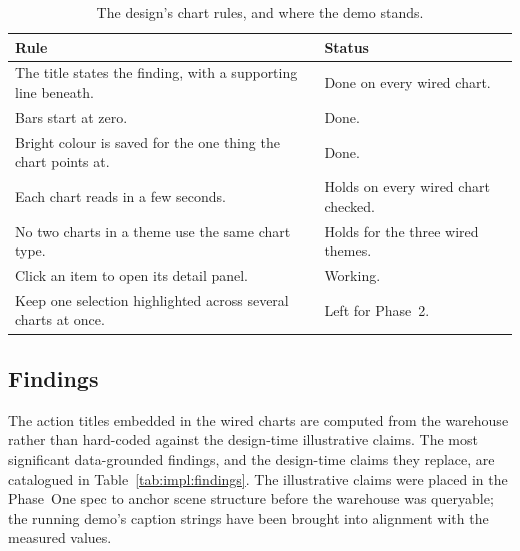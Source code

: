 \begin{table}[!htbp]
\centering
\caption{The design's chart rules, and where the demo stands.}
\label{tab:impl:invariants}
\footnotesize
\renewcommand{\arraystretch}{1.3}
\begin{tabularx}{\linewidth}{Xp{4cm}}
\hline
\textbf{Rule} & \textbf{Status} \\
\hline
The title states the finding, with a supporting line beneath.   & Done on every wired chart. \\
Bars start at zero.                                              & Done. \\
Bright colour is saved for the one thing the chart points at.   & Done. \\
Each chart reads in a few seconds.                              & Holds on every wired chart checked. \\
No two charts in a theme use the same chart type.               & Holds for the three wired themes. \\
Click an item to open its detail panel.                         & Working. \\
Keep one selection highlighted across several charts at once.   & Left for Phase~2. \\
\hline
\end{tabularx}
\end{table}

\subsection{Findings}
\label{sec:impl:eval:findings}

The action titles embedded in the wired charts are computed from the
warehouse rather than hard-coded against the design-time
illustrative claims. The most significant data-grounded findings, and
the design-time claims they replace, are catalogued in
Table~\ref{tab:impl:findings}. The illustrative claims were placed in
the Phase~One spec to anchor scene structure before the warehouse
was queryable; the running demo's caption strings have been brought
into alignment with the measured values.

